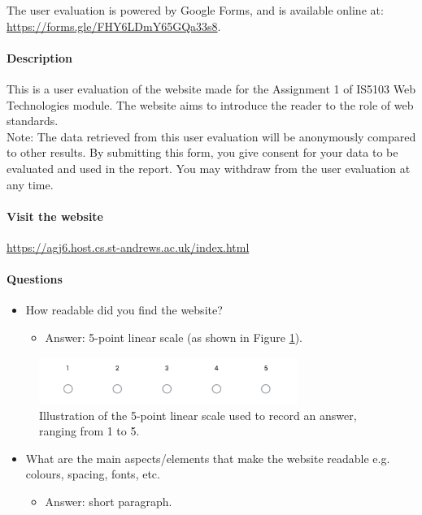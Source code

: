 \documentclass[letterpaper,12pt]{article}
\begin{document}
\begin{appendices}
The user evaluation is powered by Google Forms, and is available online at: \url{https://forms.gle/FHY6LDmY65GQa33s8}.

\paragraph{Description} This is a user evaluation of the website made for the Assignment 1 of IS5103 Web Technologies module. The website aims to introduce the reader to the role of web standards.\\

Note: The data retrieved from this user evaluation will be anonymously compared to other results. By submitting this form, you give consent for your data to be evaluated and used in the report. You may withdraw from the user evaluation at any time.

\paragraph{Visit the website} \url{https://agj6.host.cs.st-andrews.ac.uk/index.html}

\paragraph{Questions}

\begin{itemize}
    \item How readable did you find the website?
    \begin{itemize}
        \item Answer: 5-point linear scale (as shown in Figure \ref{fig:linear-scale}).
    \end{itemize}
\end{itemize}

\begin{figure}[h] 
\centerline{\includegraphics[width=0.75\textwidth]{report/images/linear_scale.png}}
\caption{\label{fig:linear-scale}Illustration of the 5-point linear scale used to record an answer, ranging from 1 to 5.}
\end{figure}

\begin{itemize}
    \item What are the main aspects/elements that make the website readable e.g. colours, spacing, fonts, etc.
    \begin{itemize}
        \item Answer: short paragraph.
    \end{itemize}
\end{itemize}


\end{appendices}
\end{document}
